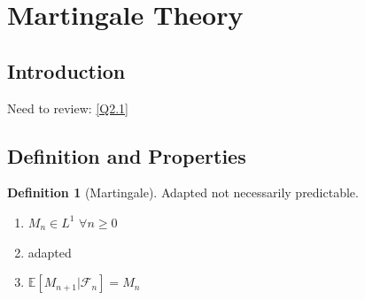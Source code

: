 \documentclass[a4paper,11pt]{book}
\theoremstyle{definition}
\newtheorem{definition}{Definition}[section]
\theoremstyle{remark}
\begin{document}
\newpage
\section{Martingale Theory}
\subsection{Introduction}
Need to review: \ref{Q2.1} 	
\subsection{Definition and Properties}
\begin{definition}[Martingale]
Adapted not necessarily predictable.
\begin{enumerate}
	\item $M_n \in L^1$ $\forall n \geq 0$
	\item adapted
	\item $\mathbb{E}[M_{n+1}|\mathcal{F}_{n}] = M_n$
\end{enumerate}
\end{definition}
\end{document}
